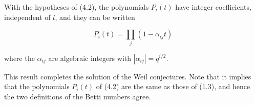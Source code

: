 With the hypotheses of (4.2), the polynomials $P_i(t)$ have integer coefficients, independent of $l$, and they can be written

$$P_i(t) = \prod_j (1 - \alpha_{ij} t)$$

where the $\alpha_{ij}$ are algebraic integers with $|\alpha_{ij}| = q^{i/2}$.

This result completes the solution of the Weil conjectures. Note that it implies that the polynomials $P_i(t)$ of (4.2) are the same as those of (1.3), and hence the two definitions of the Betti numbers agree.
